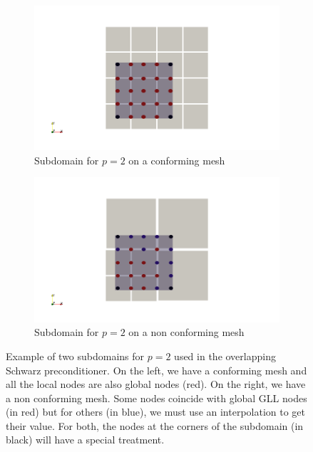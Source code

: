 \begin{figure}
\centering
\begin{subfigure}{.5\textwidth}
  \centering
  \includegraphics[width=1.2\linewidth]{Theory/fine_over_1.png}
  \caption{Subdomain for $p=2$ on a conforming mesh}
  \label{fine_over_1}
\end{subfigure}%
\begin{subfigure}{.5\textwidth}
  \centering
  \includegraphics[width=1.2\linewidth]{Theory/fine_over_2.png}
  \caption{Subdomain for $p=2$ on a non conforming mesh}
  \label{fine_over_2}
\end{subfigure}
\caption{Example of two subdomains for $p=2$ used in the overlapping Schwarz preconditioner. On the left, we have a conforming mesh and all the local nodes are also global nodes (red). On the right, we have a non conforming mesh. Some nodes coincide with global GLL nodes (in red) but for others (in blue), we must use an interpolation to get their value. For both, the nodes at the corners of the subdomain (in black) will have a special treatment.}
\label{fine_over}
\end{figure}


